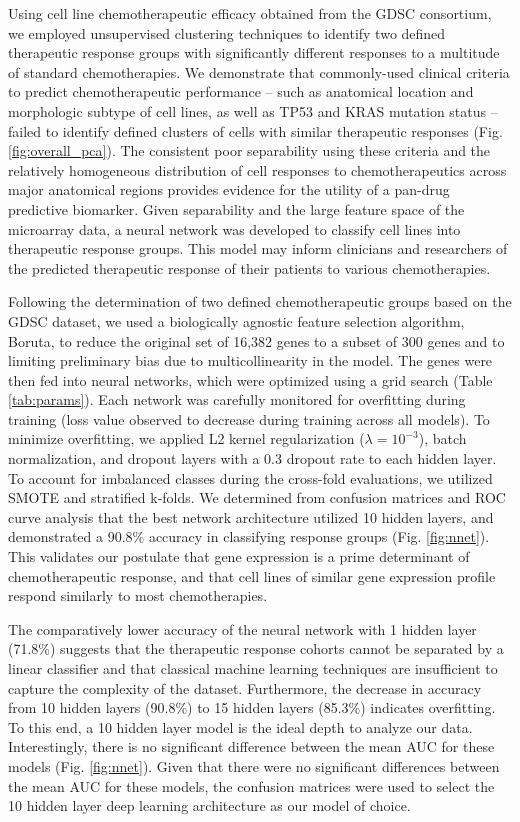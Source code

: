 \documentclass[10pt, letterpaper, twocolumn]{article}
\begin{document}
Using cell line chemotherapeutic efficacy obtained from the GDSC consortium, we employed unsupervised clustering techniques to identify two defined therapeutic response groups with significantly different responses to a multitude of standard chemotherapies. We demonstrate that commonly-used clinical criteria to predict chemotherapeutic performance -- such as anatomical location and morphologic subtype of cell lines, as well as TP53 and KRAS mutation status -- failed to identify defined clusters of cells with similar therapeutic responses (Fig. \ref{fig:overall_pca}). The consistent poor separability using these criteria and the relatively homogeneous distribution of cell responses to chemotherapeutics across major anatomical regions provides evidence for the utility of a pan-drug predictive biomarker. Given separability and the large feature space of the microarray data, a neural network was developed to classify cell lines into therapeutic response groups. This model may inform clinicians and researchers of the predicted therapeutic response of their patients to various chemotherapies.

Following the determination of two defined chemotherapeutic groups based on the GDSC dataset, we used a biologically agnostic feature selection algorithm, Boruta, to reduce the original set of 16,382 genes to a subset of 300 genes and to limiting preliminary bias due to multicollinearity in the model. The genes were then fed into neural networks, which were optimized using a grid search (Table \ref{tab:params}). Each network was carefully monitored for overfitting during training (loss value observed to decrease during training across all models). To minimize overfitting, we applied L2 kernel regularization ($\lambda=10^{-3}$), batch normalization, and dropout layers with a 0.3 dropout rate to each hidden layer. To account for imbalanced classes during the cross-fold evaluations, we utilized SMOTE and stratified k-folds. We determined from confusion matrices and ROC curve analysis that the best network architecture utilized 10 hidden layers, and demonstrated a 90.8\% accuracy in classifying response groups (Fig. \ref{fig:nnet}). This validates our postulate that gene expression is a prime determinant of chemotherapeutic response, and that cell lines of similar gene expression profile respond similarly to most chemotherapies.

The comparatively lower accuracy of the neural network with 1 hidden layer (71.8\%) suggests that the therapeutic response cohorts cannot be separated by a linear classifier and that classical machine learning techniques are insufficient to capture the complexity of the dataset. Furthermore, the decrease in accuracy from 10 hidden layers (90.8\%) to 15 hidden layers (85.3\%) indicates overfitting. To this end, a 10 hidden layer model is the ideal depth to analyze our data. Interestingly, there is no significant difference between the mean AUC for these models (Fig. \ref{fig:nnet}). Given that there were no significant differences between the mean AUC for these models, the confusion matrices were used to select the 10 hidden layer deep learning architecture as our model of choice.
\end{document}
